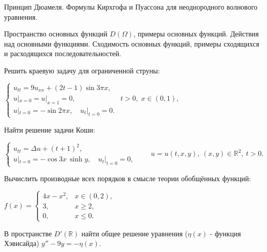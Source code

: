 
\begin{cond}
	Принцип Дюамеля. Формулы Кирхгофа и Пуассона для неоднородного волнового уравнения.
\end{cond}

\begin{cond}
	Пространство основных функций $D(\Omega)$, примеры основных функций. Действия над основными функциями. Сходимость основных функций, примеры сходящихся и расходящихся последовательностей.
\end{cond}

\begin{cond}
	Решить краевую задачу для ограниченной струны:

	\(
	\begin{cases}
		u_{tt} = 9u_{xx} + (2t - 1)\sin 3\pi x,          \\
		u|_{x=0} = u|_{x=1} = 0, & t > 0,\; x \in (0,1), \\
		u|_{t=0} = -\sin 2\pi x,\quad u_t|_{t=0} = 0.
	\end{cases}
	\)
\end{cond}

\begin{cond}
	Найти решение задачи Коши:

	\(
	\begin{cases}
		u_{tt} = \Delta u + (t+1)^2, \\
		u|_{t=0} = -\cos 3x\,\sinh y,\quad u_t|_{t=0} = 0,
	\end{cases}
	\qquad
	u = u(t,x,y),\ (x,y)\in\mathbb{R}^2,\ t>0.
	\)
\end{cond}

\begin{cond}
	Вычислить производные всех порядков в смысле теории обобщённых функций:

	\(
	f(x) =
	\begin{cases}
		4x - x^2, & x \in (0,2), \\
		3,        & x \ge 2,     \\
		0,        & x \le 0.
	\end{cases}
	\)
\end{cond}

\begin{cond}
	В пространстве \(D'(\mathbb{R})\) найти общее решение уравнения ($\eta(x)$ - функция Хэвисайда)
	$y'' - 9y = -\eta(x)$.
\end{cond}
